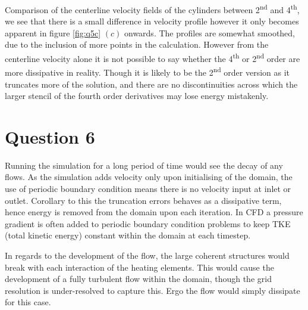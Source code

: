 \documentclass[10pt, a4paper]{article}
\begin{document}
Comparison of the centerline velocity fields of the cylinders between 2\textsuperscript{nd} and 4\textsuperscript{th}, we see that there is a small difference in velocity profile however it only becomes apparent in figure \ref{fig:q5c} $(c)$ onwards. The profiles are somewhat smoothed, due to the inclusion of more points in the calculation. However from the centerline velocity alone it is not possible to say whether the 4\textsuperscript{th} or 2\textsuperscript{nd} order are more dissipative in reality. Though it is likely to be the 2\textsuperscript{nd} order version as it truncates more of the solution, and there are no discontinuities across which the larger stencil of the fourth order derivatives may lose energy mistakenly.

\section*{Question 6}

Running the simulation for a long period of time would see the decay of any flows. As the simulation adds velocity only upon initialising of the domain, the use of periodic boundary condition means there is no velocity input at inlet or outlet. Corollary to this the truncation errors behaves as a dissipative term, hence energy is removed from the domain upon each iteration. In CFD a pressure gradient is often added to periodic boundary condition problems to keep TKE (total kinetic energy) constant within the domain at each timestep.

In regards to the development of the flow, the large coherent structures would break with each interaction of the heating elements. This would cause the development of a fully turbulent flow within the domain, though the grid resolution is under-resolved to capture this. Ergo the flow would simply dissipate for this case.

\newpage
%
\end{document}

